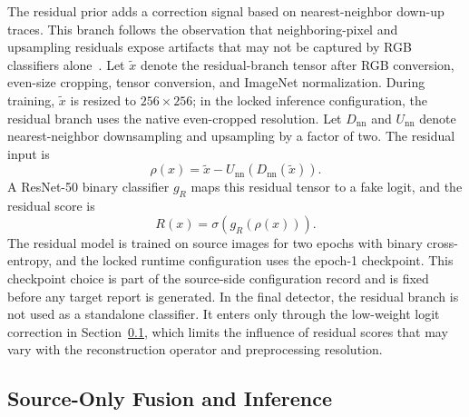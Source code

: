 \documentclass[lettersize,journal]{IEEEtran}
\begin{document}
The residual prior adds a correction signal based on nearest-neighbor down-up traces. This branch follows the observation that neighboring-pixel and upsampling residuals expose artifacts that may not be captured by RGB classifiers alone~\cite{tan2024npr}. Let $\tilde{x}$ denote the residual-branch tensor after RGB conversion, even-size cropping, tensor conversion, and ImageNet normalization. During training, $\tilde{x}$ is resized to $256 \times 256$; in the locked inference configuration, the residual branch uses the native even-cropped resolution. Let $D_{\mathrm{nn}}$ and $U_{\mathrm{nn}}$ denote nearest-neighbor downsampling and upsampling by a factor of two. The residual input is
\begin{equation}
    \rho(x)=\tilde{x}-U_{\mathrm{nn}}(D_{\mathrm{nn}}(\tilde{x})).
\end{equation}
A ResNet-50 binary classifier $g_R$ maps this residual tensor to a fake logit, and the residual score is
\begin{equation}
    R(x)=\sigma(g_R(\rho(x))).
\end{equation}
The residual model is trained on source images for two epochs with binary cross-entropy, and the locked runtime configuration uses the epoch-1 checkpoint. This checkpoint choice is part of the source-side configuration record and is fixed before any target report is generated. In the final detector, the residual branch is not used as a standalone classifier. It enters only through the low-weight logit correction in Section~\ref{sec:method_fusion}, which limits the influence of residual scores that may vary with the reconstruction operator and preprocessing resolution.

\subsection{Source-Only Fusion and Inference}
\label{sec:method_fusion}
\end{document}
